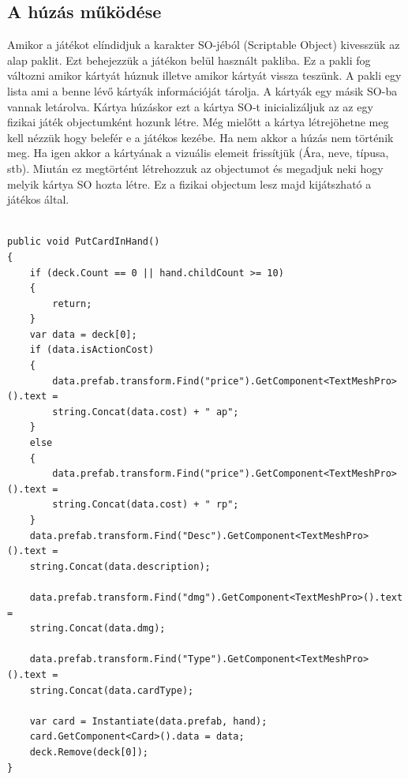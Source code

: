 \clearpage

\subsection{A húzás működése}
Amikor a játékot elíndidjuk a karakter SO-jéból (Scriptable Object) kivesszük az alap paklit. Ezt behejezzük a játékon belül használt pakliba. Ez a pakli fog változni amikor kártyát húznuk illetve amikor kártyát vissza teszünk. A pakli egy lista ami a benne lévő kártyák információját tárolja. A kártyák egy másik SO-ba vannak letárolva. Kártya húzáskor ezt a kártya SO-t inicializáljuk az az egy fizikai játék objectumként hozunk létre.
Még mielőtt a kártya létrejöhetne meg kell nézzük hogy belefér e a játékos kezébe. Ha nem akkor a húzás nem történik meg. Ha igen akkor a kártyának a vizuális elemeit frissítjük (Ára, neve, típusa, stb). Miután ez megtörtént létrehozzuk az objectumot és megadjuk neki hogy melyik kártya SO hozta létre. Ez a fizikai objectum lesz majd kijátszható a játékos által.
\\\
\begin{lstlisting}[language=CSharp,style=CSharpBase,caption={A kártya kézbe helyezése}]
public void PutCardInHand()
{
    if (deck.Count == 0 || hand.childCount >= 10)
    {
        return;
    }
    var data = deck[0];
    if (data.isActionCost)
    {
        data.prefab.transform.Find("price").GetComponent<TextMeshPro>().text = 
        string.Concat(data.cost) + " ap";
    }
    else
    {
        data.prefab.transform.Find("price").GetComponent<TextMeshPro>().text = 
        string.Concat(data.cost) + " rp";
    }
    data.prefab.transform.Find("Desc").GetComponent<TextMeshPro>().text =
    string.Concat(data.description);
    
    data.prefab.transform.Find("dmg").GetComponent<TextMeshPro>().text = 
    string.Concat(data.dmg);
    
    data.prefab.transform.Find("Type").GetComponent<TextMeshPro>().text = 
    string.Concat(data.cardType);
    
    var card = Instantiate(data.prefab, hand);
    card.GetComponent<Card>().data = data;
    deck.Remove(deck[0]);
}
\end{lstlisting}
\clearpage
